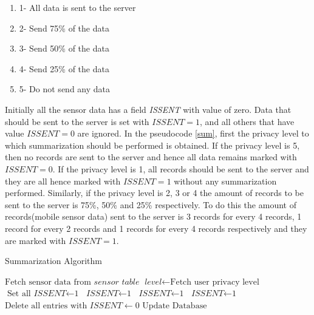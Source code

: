 \begin{enumerate}
	\item 1- All data is sent to the server
	\item 2- Send 75\% of the data
    \item 3- Send 50\% of the data
    \item 4- Send 25\% of the data
    \item 5- Do not send any data
\end{enumerate}

Initially all the sensor data has a field \textit{ISSENT} with value of zero. Data that should be sent to the server is set with $\textit{ISSENT}=1$, and all others that have value $\textit{ISSENT}=0$ are ignored. In the pseudocode \ref{sum}, first the privacy level to which summarization should be performed is obtained. If the privacy level is 5, then no records are sent to the server and hence all data remains marked with $\textit{ISSENT}=0$. If the privacy level is 1, all records should be sent to the server and they are all hence marked with $\textit{ISSENT}=1$ without any summarization performed. Similarly, if the privacy level is 2, 3 or 4 the amount of records to be sent to the server is 75\%, 50\% and 25\% respectively. To do this the amount of records(mobile sensor data) sent to the server is 3 records for every 4 records, 1 record for every 2 records and 1 records for every 4 records respectively and they are marked with $\textit{ISSENT}=1$.

\begin{algorithm}
\caption{Summarization Algorithm}\label{sum}
\begin{algorithmic}[1]
\State $\text{Fetch sensor data from } \textit{sensor table}$
\State $\textit{level} \gets \text{Fetch user privacy level}$
  \State $\text{Set all } \textit{ISSENT} \gets \text{1}$
 	 \State $\textit{ISSENT} \gets \text{1}$
 	\EndFor 
{}
 	 \State $\textit{ISSENT} \gets \text{1}$
 	\EndFor
{}
 	 \State $\textit{ISSENT} \gets \text{1}$
 	\EndFor
\EndIf
\State $\text{Delete all entries with } \textit{ISSENT} \gets 0$
\State $\text{Update Database}$
\EndFor
\EndProcedure
\end{algorithmic}
\end{algorithm}

